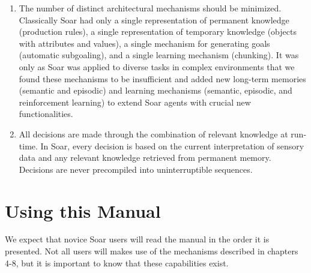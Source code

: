 \begin{enumerate}
\item The number of distinct architectural mechanisms should be minimized.
        Classically Soar had only a single representation of permanent knowledge
        (production rules), a single representation of temporary knowledge (objects
        with attributes and values), a single mechanism for generating goals
        (automatic subgoaling), and a single learning mechanism (chunking).
        It was only as Soar was applied to diverse tasks in complex environments that
        we found these mechanisms to be insufficient and added new
        long-term memories (semantic and episodic) and learning mechanisms
        (semantic, episodic, and reinforcement learning) to extend Soar agents
        with crucial new functionalities.
\vspace{-6pt}

\item All decisions are made through the combination of relevant knowledge at
        run-time.  In Soar, every decision is based on the current
        interpretation of sensory data and any relevant knowledge retrieved
        from permanent memory.  Decisions are never precompiled into
        uninterruptible sequences.
\end{enumerate}


\section{Using this Manual}


We expect that novice Soar users will read the manual in the order it is
presented. Not all users will makes use of the mechanisms described in chapters 4-8,
but it is important to know that these capabilities exist.

